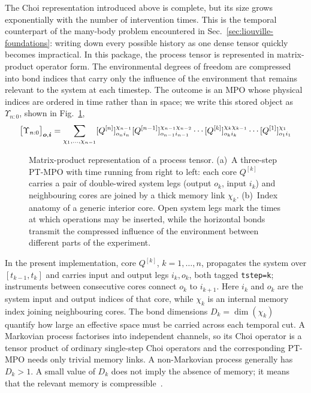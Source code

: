 The Choi representation introduced above is complete, but its size grows exponentially with the number of intervention times.
This is the temporal counterpart of the many-body problem encountered in Sec.~\ref{sec:liouville-foundations}: writing down every possible history as one dense tensor quickly becomes impractical.
In this package, the process tensor is represented in matrix-product operator form.
The environmental degrees of freedom are compressed into bond indices that carry only the influence of the environment that remains relevant to the system at each timestep.
The outcome is an MPO whose physical indices are ordered in time rather than in space; we write this stored object as \(\Upsilon_{n:0}\), shown in Fig.~\ref{fig:process-tensor-anatomy},
%
\begin{equation}
    \bigl[\Upsilon_{n:0}\bigr]_%
    {\boldsymbol{o},\boldsymbol{i}}
    = \sum_{\chi_1,\ldots,\chi_{n-1}} [Q^{[n]}]_{o_{n} i_{n}}^{\chi_{n-1}} [Q^{[n-1]}]_{o_{n-1} i_{n-1}}^{\chi_{n-1} \chi_{n-2}} \cdots [Q^{[k]}]_{o_{k} i_{k}}^{\chi_{k} \chi_{k-1}} \cdots [Q^{[1]}]_{o_{1} i_{1}}^{\chi_{1}}
    \label{eq:pt-mpo-decomposition}
\end{equation}
%
\begin{figure}[H]
    \centering \scalebox{1.0}{} \caption{
        Matrix-product representation of a process tensor.
        (a)~A three-step PT-MPO with time running from right to left: each core \(Q^{[k]}\) carries a pair of double-wired system legs (output \(o_k\), input \(i_k\)) and neighbouring cores are joined by a thick memory link \(\chi_k\).
        (b)~Index anatomy of a generic interior core.
        Open system legs mark the times at which operations may be inserted, while the horizontal bonds transmit the compressed influence of the environment between different parts of the experiment.
    }
    \label{fig:process-tensor-anatomy}
\end{figure}
%
In the present implementation, core \(Q^{[k]}\), \(k=1,\ldots,n\), propagates the system over \([t_{k-1},t_k]\) and carries input and output legs \(i_k,o_k\), both tagged \texttt{tstep=k}; instruments between consecutive cores connect \(o_k\) to \(i_{k+1}\).
Here \(i_k\) and \(o_k\) are the system input and output indices of that core, while \(\chi_k\) is an internal memory index joining neighbouring cores.
The bond dimensions \(D_k=\dim(\chi_k)\) quantify how large an effective space must be carried across each temporal cut.
A Markovian process factorises into independent channels, so its Choi operator is a tensor product of ordinary single-step Choi operators and the corresponding PT-MPO needs only trivial memory links.
A non-Markovian process generally has \(D_k>1\).
A small value of \(D_k\) does not imply the absence of memory; it means that the relevant memory is compressible~\cite{Pollock2018Framework,Jorgensen2019}.

